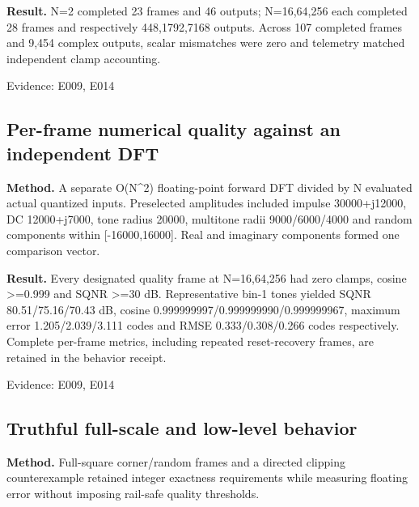 \documentclass[11pt,a4paper]{article}
\begin{document}
\textbf{Result.} N=\allowbreak{}2 completed 23 frames and 46 outputs; N=\allowbreak{}16,\allowbreak{}64,\allowbreak{}256 each completed 28 frames and respectively 448,\allowbreak{}1792,\allowbreak{}7168 outputs. Across 107 completed frames and 9,\allowbreak{}454 complex outputs,\allowbreak{} scalar mismatches were zero and telemetry matched independent clamp accounting.

{\small Evidence: E009,\allowbreak{} E014}

\subsection{Per-frame numerical quality against an independent DFT}

\textbf{Method.} A separate O(\allowbreak{}N\textasciicircum{}2)\allowbreak{} floating-point forward DFT divided by N evaluated actual quantized inputs. Preselected amplitudes included impulse 30000+\allowbreak{}j12000,\allowbreak{} DC 12000+\allowbreak{}j7000,\allowbreak{} tone radius 20000,\allowbreak{} multitone radii 9000/\allowbreak{}6000/\allowbreak{}4000 and random components within [\allowbreak{}-16000,\allowbreak{}16000]\allowbreak{}. Real and imaginary components formed one comparison vector.

\textbf{Result.} Every designated quality frame at N=\allowbreak{}16,\allowbreak{}64,\allowbreak{}256 had zero clamps,\allowbreak{} cosine >=\allowbreak{}0.999 and SQNR >=\allowbreak{}30 dB. Representative bin-1 tones yielded SQNR 80.51/\allowbreak{}75.16/\allowbreak{}70.43 dB,\allowbreak{} cosine 0.999999997/\allowbreak{}0.999999990/\allowbreak{}0.999999967,\allowbreak{} maximum error 1.205/\allowbreak{}2.039/\allowbreak{}3.111 codes and RMSE 0.333/\allowbreak{}0.308/\allowbreak{}0.266 codes respectively. Complete per-frame metrics,\allowbreak{} including repeated reset-recovery frames,\allowbreak{} are retained in the behavior receipt.

{\small Evidence: E009,\allowbreak{} E014}

\subsection{Truthful full-scale and low-level behavior}

\textbf{Method.} Full-square corner/\allowbreak{}random frames and a directed clipping counterexample retained integer exactness requirements while measuring floating error without imposing rail-safe quality thresholds.
\end{document}
